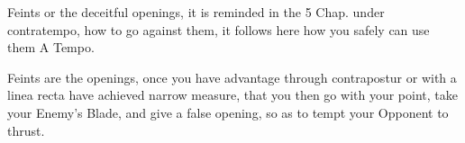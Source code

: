 

Feints or the deceitful openings, it is reminded in the 5 Chap. under
contratempo, how to go against them, it follows here how you safely
can use them A Tempo.


Feints are the openings, once you have advantage through contrapostur
or with a linea recta have achieved narrow measure, that you then go
with your point, take your Enemy's Blade, and give a false opening, so
as to tempt your Opponent to thrust.